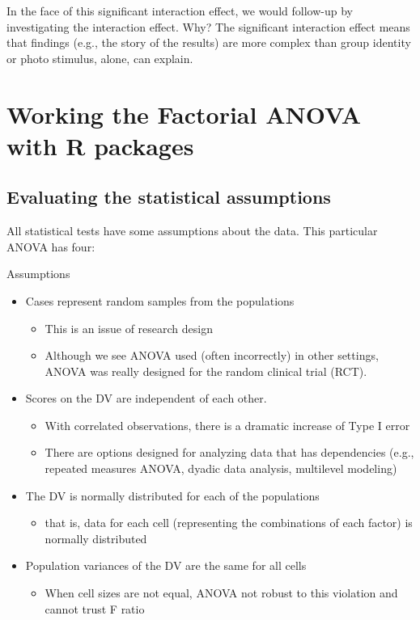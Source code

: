 \documentclass[
  11pt,
]{book}
\providecommand{\tightlist}{%
  \setlength{\itemsep}{0pt}\setlength{\parskip}{0pt}}
\begin{document}
In the face of this significant interaction effect, we would follow-up by investigating the interaction effect. Why? The significant interaction effect means that findings (e.g., the story of the results) are more complex than group identity or photo stimulus, alone, can explain.

\hypertarget{working-the-factorial-anova-with-r-packages}{%
\section{Working the Factorial ANOVA with R packages}\label{working-the-factorial-anova-with-r-packages}}

\hypertarget{evaluating-the-statistical-assumptions-1}{%
\subsection{Evaluating the statistical assumptions}\label{evaluating-the-statistical-assumptions-1}}

All statistical tests have some assumptions about the data. This particular ANOVA has four:

Assumptions

\begin{itemize}
\tightlist
\item
  Cases represent random samples from the populations

  \begin{itemize}
  \tightlist
  \item
    This is an issue of research design
  \item
    Although we see ANOVA used (often incorrectly) in other settings, ANOVA was really designed for the random clinical trial (RCT).
  \end{itemize}
\item
  Scores on the DV are independent of each other.

  \begin{itemize}
  \tightlist
  \item
    With correlated observations, there is a dramatic increase of Type I error
  \item
    There are options designed for analyzing data that has dependencies (e.g., repeated measures ANOVA, dyadic data analysis, multilevel modeling)
  \end{itemize}
\item
  The DV is normally distributed for each of the populations

  \begin{itemize}
  \tightlist
  \item
    that is, data for each cell (representing the combinations of each factor) is normally distributed
  \end{itemize}
\item
  Population variances of the DV are the same for all cells

  \begin{itemize}
  \tightlist
  \item
    When cell sizes are not equal, ANOVA not robust to this violation and cannot trust F ratio
  \end{itemize}
\end{itemize}
\end{document}
